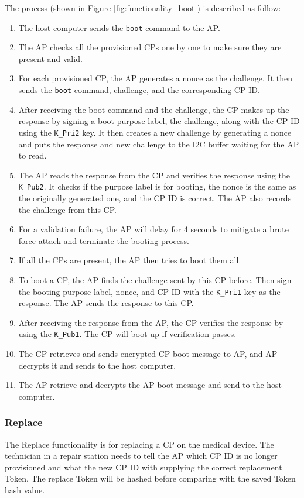 \documentclass[11pt,oneside,onecolumn,letterpaper]{article}
\begin{document}
	The process (shown in Figure \ref{fig:functionality_boot}) is described as follow:
	\begin{enumerate}
		\item The host computer sends the \texttt{boot} command to the AP.
		\item The AP checks all the provisioned CPs one by one to make sure they are present and valid.
		\item For each provisioned CP,
		the AP generates a nonce as the challenge.
		It then sends the \texttt{boot} command,
		challenge,
		and the corresponding CP ID.
		\item After receiving the boot command and the challenge,
		the CP makes up the response by signing a boot purpose label,
		the challenge,
		along with the CP ID using the \texttt{K\_Pri2} key.
		It then creates a new challenge by generating a nonce and puts the response and new challenge to the I2C buffer waiting for the AP to read.
		\item The AP reads the response from the CP and verifies the response using the \texttt{K\_Pub2}.
		It checks if the purpose label is for booting,
		the nonce is the same as the originally generated one,
		and the CP ID is correct.
		The AP also records the challenge from this CP.
		\item For a validation failure,
		the AP will delay for 4 seconds to mitigate a brute force attack and terminate the booting process.
		\item If all the CPs are present,
		the AP then tries to boot them all.
		\item To boot a CP,
		the AP finds the challenge sent by this CP before.
		Then sign the booting purpose label, nonce, and CP ID with the \texttt{K\_Pri1} key as the response.
		The AP sends the response to this CP.
		\item After receiving the response from the AP,
		the CP verifies the response by using the \texttt{K\_Pub1}.
		The CP will boot up if verification passes.
		\item The CP retrieves and sends encrypted CP boot message to AP, and AP decrypts it and sends to the host computer.
		\item The AP retrieve and decrypts the AP boot message and send to the host computer.
	\end{enumerate}
	
	\subsubsection{Replace}
	The Replace functionality is for replacing a CP on the medical device.
	The technician in a repair station needs to tell the AP which CP ID is no longer provisioned and what the new CP ID with supplying the correct replacement Token.
	The replace Token will be hashed before comparing with the saved Token hash value.
	
\end{document}
